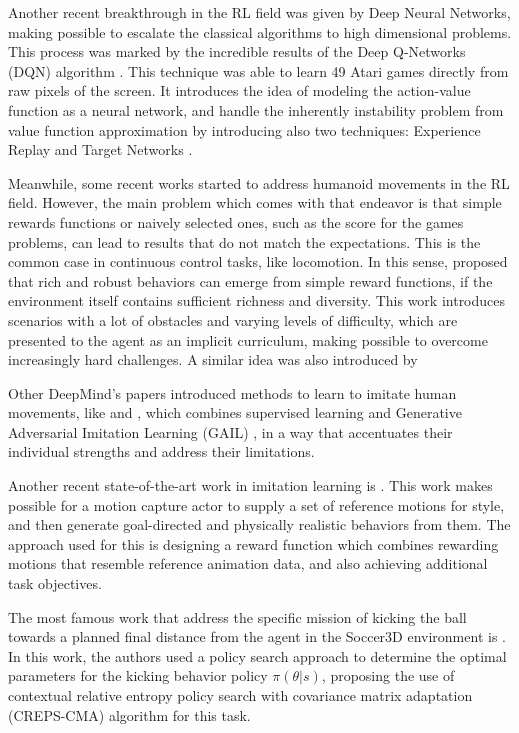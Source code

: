 Another recent breakthrough in the RL field was given by Deep Neural Networks, making possible to escalate the classical algorithms to high dimensional problems. This process was marked by the incredible results of the Deep Q-Networks (DQN) algorithm \cite{RLNature2015}. This technique was able to learn 49 Atari games directly from raw pixels of the screen. It introduces the idea of modeling the action-value function as a neural network, and handle the inherently instability problem from value function approximation by introducing also two techniques: Experience Replay \cite{ReplayBuffer} and Target Networks \cite{RLNature2015}.

Meanwhile, some recent works started to address humanoid movements in the RL field. However, the main problem which comes with that endeavor is that simple rewards functions or naively selected ones, such as the score for the games problems, can lead to results that do not match the expectations. This is the common case in continuous control tasks, like locomotion. In this sense, \cite{deepmind1} proposed that rich and robust behaviors can emerge from simple reward functions, if the environment itself contains sufficient richness and diversity. This work introduces scenarios with a lot of obstacles and varying levels of difficulty, which are presented to the agent as an implicit curriculum, making possible to overcome increasingly hard challenges. A similar idea was also introduced by \cite{BengioCurrLearning}

Other DeepMind's papers introduced methods to learn to imitate human movements, like \cite{deepmind2} and \cite{deepmind3}, which combines supervised learning and Generative Adversarial Imitation Learning (GAIL) \cite{gail}, in a way that accentuates their individual strengths and address their limitations.

Another recent state-of-the-art work in imitation learning is \cite{deepmimic}. This work makes possible for a motion capture actor to supply a set of reference motions for style, and then generate goal-directed and physically realistic behaviors from them. The approach used for this is designing a reward function which combines rewarding motions that resemble reference animation data, and also achieving additional task objectives.

The most famous work that address the specific mission of kicking the ball towards a planned final distance from the agent in the Soccer3D environment is \cite{abbas}. In this work, the authors used a policy search approach to determine the optimal parameters for the kicking behavior policy $\pi(\theta | s)$, proposing the use of contextual relative entropy policy search with covariance matrix adaptation (CREPS-CMA) algorithm for this task.

